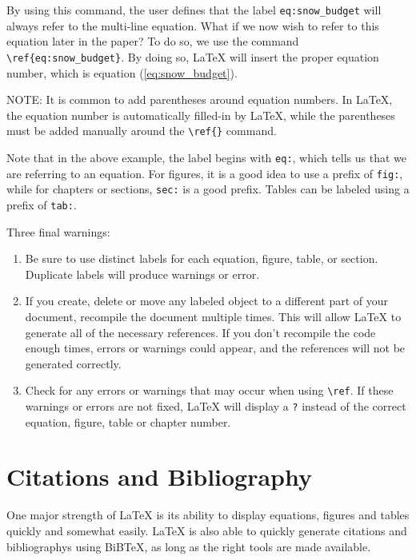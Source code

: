 \documentclass[master]{UWMThesis}
\begin{document}
By using this command, the user defines that the label \verb=eq:snow_budget= will always refer to the multi-line equation.  What if we now wish to refer to this equation later in the paper?  To do so, we use the command \verb=\ref{eq:snow_budget}=.  By doing so, LaTeX will insert the proper equation number, which is equation (\ref{eq:snow_budget}).

NOTE: It is common to add parentheses around equation numbers.  In LaTeX, the equation number is automatically filled-in by LaTeX, while the parentheses must be added manually around the \verb=\ref{}= command.

Note that in the above example, the label begins with \verb=eq:=, which tells us that we are referring to an equation.  For figures, it is a good idea to use a prefix of \verb=fig:=, while for chapters or sections, \verb=sec:= is a good prefix.  Tables can be labeled using a prefix of \verb=tab:=.

Three final warnings:

\begin{enumerate}
\item Be sure to use distinct labels for each equation, figure, table, or section.  Duplicate labels will produce warnings or error.

\item If you create, delete or move any labeled object to a different part of your document, recompile the document multiple times.  This will allow LaTeX to generate all of the necessary references.  If you don't recompile the code enough times, errors or warnings could appear, and the references will not be generated correctly.

\item Check for any errors or warnings that may occur when using \verb=\ref=.  If these warnings or errors are not fixed, LaTeX will display a \verb=?= instead of the correct equation, figure, table or chapter number.

\end{enumerate}


\chapter{Citations and Bibliography}
One major strength of LaTeX is its ability to display equations, figures and tables quickly and somewhat easily.  LaTeX is also able to quickly generate citations and bibliographys using BiBTeX, as long as the right tools are made available.
\end{document}
